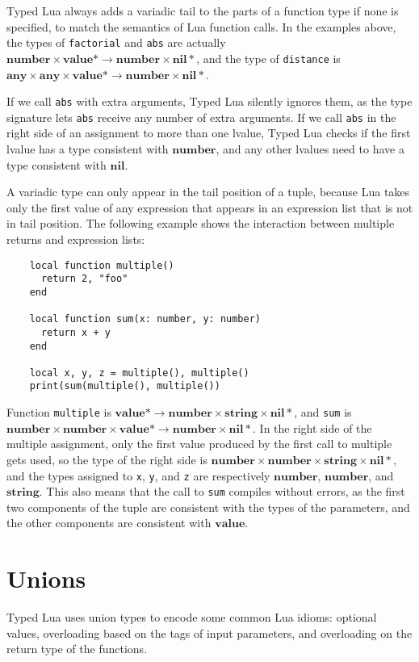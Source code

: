 \documentclass[preprint]{sig-alternate}
\newcommand{\Any}{\mathbf{any}}
\newcommand{\Top}{\mathbf{value}}
\newcommand{\Nil}{\mathbf{nil}}
\newcommand{\Number}{\mathbf{number}}
\newcommand{\String}{\mathbf{string}}
\begin{document}
Typed Lua always adds a
variadic tail to the parts of a function type if none is specified, to match
the semantics of Lua function calls. In the examples above, the types
of {\tt factorial} and {\tt abs} are actually $\Number \times \Top *
 \rightarrow \Number \times \Nil *$, and the type of {\tt distance} is
$\Any \times \Any \times \Top * \rightarrow \Number \times \Nil *$.

If we call {\tt abs} with extra arguments, Typed Lua silently ignores
them, as the type signature lets {\tt abs} receive any number of extra
arguments. If we call {\tt abs} in the right side of an assignment to
more than one lvalue, Typed Lua checks if the first lvalue has a type
consistent with $\Number$, and any other lvalues need to have a type
consistent with $\Nil$.

A variadic type can only appear in the tail position of a tuple,
because Lua takes only the first value of any expression that appears
in an expression list that is not in tail position. The following example
shows the interaction between multiple returns and expression lists:

\begin{verbatim}
    local function multiple()
      return 2, "foo"
    end

    local function sum(x: number, y: number)
      return x + y
    end

    local x, y, z = multiple(), multiple()
    print(sum(multiple(), multiple())
\end{verbatim}

Function {\tt multiple} is
$\Top * \rightarrow \Number \times \String \times \Nil *$,
and {\tt sum} is $\Number \times \Number \times \Top * \rightarrow
\Number \times \Nil *$. In the right side of the multiple assignment,
only the first value produced by the first call to multiple gets used, so
the type of the right side is $\Number \times \Number \times \String \times \Nil*$,
and the types assigned to {\tt x}, {\tt y}, and {\tt z} are respectively $\Number$,
$\Number$, and $\String$. This also means that the call to {\tt sum} compiles
without errors, as the first two components of the tuple are consistent with
the types of the parameters, and the other components are consistent with
$\Top$.

\section{Unions}
\label{sec:unions}

Typed Lua uses union types to encode some common Lua idioms:
optional values, overloading based on the tags of input parameters,
and overloading on the return type of the functions.
\end{document}
